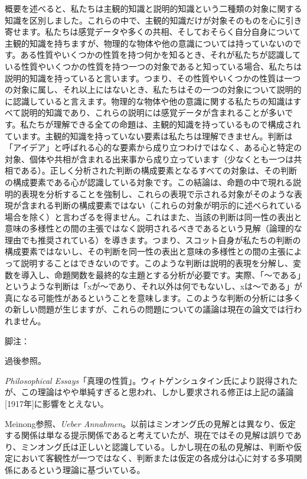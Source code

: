 \documentclass[a4paper,11pt,openany]{ltjsbook}
\begin{document}
概要を述べると、私たちは主観的知識と説明的知識という二種類の対象に関する知識を区別しました。これらの中で、主観的知識だけが対象そのものを心に引き寄せます。私たちは感覚データや多くの共相、そしておそらく自分自身について主観的知識を持ちますが、物理的な物体や他の意識については持っていないのです。ある性質やいくつかの性質を持つ何かを知るとき、それが私たちが認識している性質やいくつかの性質を持つ一つの対象であると知っている場合、私たちは説明的知識を持っていると言います。つまり、その性質やいくつかの性質は一つの対象に属し、それ以上にはないとき、私たちはその一つの対象について説明的に認識していると言えます。物理的な物体や他の意識に関する私たちの知識はすべて説明的知識であり、これらの説明には感覚データが含まれることが多いです。私たちが理解できる全ての命題は、主観的知識を持っているもので構成されています。主観的知識を持っていない要素は私たちは理解できません。判断は「アイデア」と呼ばれる心的な要素から成り立つわけではなく、ある心と特定の対象、個体や共相が含まれる出来事から成り立っています（少なくとも一つは共相である）。正しく分析された判断の構成要素となるすべての対象は、その判断の構成要素である心が認識している対象です。この結論は、命題の中で現れる説明的表現を分析することを強制し、これらの表現で示される対象がそのような表現が含まれる判断の構成要素ではない（これらの対象が明示的に述べられている場合を除く）と言わざるを得ません。これはまた、当該の判断は同一性の表出と意味の多様性との間の主張ではなく説明されるべきであるという見解（論理的な理由でも推奨されている）を導きます。つまり、スコット自身が私たちの判断の構成要素ではないし、その判断を同一性の表出と意味の多様性との間の主張によって説明することはできないのです。このような判断は説明的表現を分解し、変数を導入し、命題関数を最終的な主題とする分析が必要です。実際、「〜である」というような判断は「xが〜であり、それ以外は何でもないし、xは〜である」が真になる可能性があるということを意味します。このような判断の分析には多くの新しい問題が生じますが、これらの問題についての議論は現在の論文では行われません。


脚注：

 過後参照。

 \textit{Philosophical Essays}「真理の性質」。ウィトゲンシュタイン氏により説得されたが、この理論はやや単純すぎると思われ、しかし要求される修正は上記の議論[1917年]に影響をとえない。

 Meinong参照、\textit{Ueber Annahmen}。以前はミンオング氏の見解とは異なり、仮定する関係は単なる提示関係であると考えていたが、現在ではその見解は誤りであり、ミンオング氏は正しいと認識している。しかし現在の私の見解は、判断や仮定において客観性が一つではなく、判断または仮定の各成分は心に対する多項関係にあるという理論に基づいている。
\end{document}
